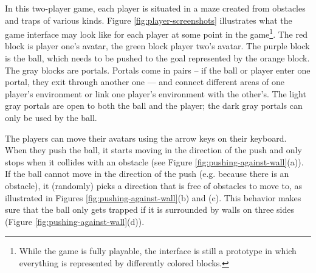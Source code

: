 In this two-player game, each player is situated in a maze created
from obstacles and traps of various kinds.  Figure
\ref{fig:player-screenshots} illustrates what the game interface may
look like for each player at some point in the
game\footnote{While the game is fully playable, the interface is still
  a prototype in which everything is represented by differently
  colored blocks.}. The red block is player one's avatar, the green
block player two's avatar. The purple block is the ball, which needs
to be pushed to the goal represented by the orange block. The 
gray blocks are portals. Portals come in pairs -- if the ball or
player enter one portal, they exit through another one --- and connect
different areas of one player's environment or link one player's
environment with the other's. The light gray portals are open to both the
ball and the player; the dark gray portals can only be used by the ball.



The players can move their avatars using the arrow keys on their
keyboard. When they push the ball, it starts moving in the direction
of the push and only stops when it collides with an obstacle (see
Figure \ref{fig:pushing-against-wall}(a)). If the
ball cannot move in the direction of the push (e.g. because there is
an obstacle), it (randomly) picks a direction that is free of
obstacles to move to, as illustrated in Figures
\ref{fig:pushing-against-wall}(b) and (c). This behavior makes sure
that the ball only gets trapped if it is surrounded by walls on three
sides (Figure \ref{fig:pushing-against-wall}(d)).

